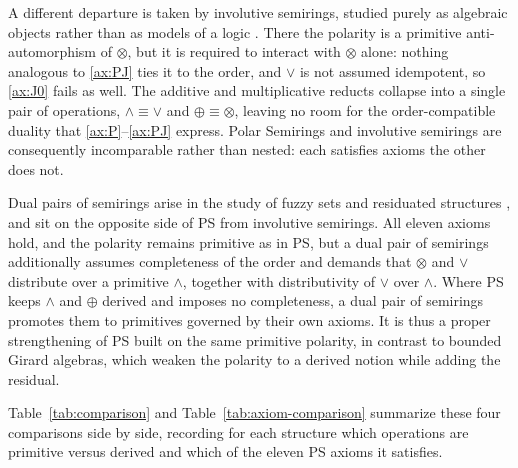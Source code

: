 A different departure is taken by involutive semirings, studied purely as
algebraic objects rather than as models of a logic
\citep{dolinka2000minimal,dheena2018ideals}. There the polarity is a
primitive anti-automorphism of $\otimes$, but it is required to interact
with $\otimes$ alone: nothing analogous to \eqref{ax:PJ} ties it to the
order, and $\vee$ is not assumed idempotent, so \eqref{ax:J0} fails as
well. The additive and multiplicative reducts collapse into a single
pair of operations, $\wedge \equiv \vee$ and $\oplus \equiv \otimes$,
leaving no room for the order-compatible duality that
\eqref{ax:P}--\eqref{ax:PJ} express. Polar Semirings and involutive
semirings are consequently incomparable rather than nested: each satisfies
axioms the other does not.

Dual pairs of semirings arise in the study of fuzzy sets and
residuated structures \citep{movckovr2025unification}, and sit on the
opposite side of PS from involutive semirings. All eleven axioms hold,
and the polarity remains primitive as in PS, but a dual pair of
semirings additionally assumes completeness of the order and demands that
$\otimes$ and $\vee$ distribute over a primitive $\wedge$, together with
distributivity of $\vee$ over $\wedge$. Where PS keeps $\wedge$ and
$\oplus$ derived and imposes no completeness, a dual pair of semirings
promotes them to primitives governed by their own axioms. It is thus a
proper strengthening of PS built on the same primitive polarity, in
contrast to bounded Girard algebras, which weaken the polarity to a
derived notion while adding the residual.

Table~\ref{tab:comparison} and Table~\ref{tab:axiom-comparison} summarize
these four comparisons side by side, recording for each structure which
operations are primitive versus derived and which of the eleven PS
axioms it satisfies.




